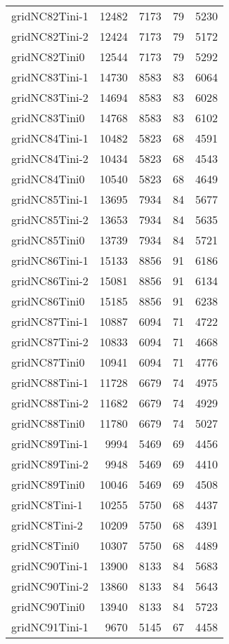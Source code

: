 \begin{longtable}{lrrrr}
gridNC82Tini-1 & 12482 & 7173 & 79 & 5230 \\
gridNC82Tini-2 & 12424 & 7173 & 79 & 5172 \\
gridNC82Tini0 & 12544 & 7173 & 79 & 5292 \\
gridNC83Tini-1 & 14730 & 8583 & 83 & 6064 \\
gridNC83Tini-2 & 14694 & 8583 & 83 & 6028 \\
gridNC83Tini0 & 14768 & 8583 & 83 & 6102 \\
gridNC84Tini-1 & 10482 & 5823 & 68 & 4591 \\
gridNC84Tini-2 & 10434 & 5823 & 68 & 4543 \\
gridNC84Tini0 & 10540 & 5823 & 68 & 4649 \\
gridNC85Tini-1 & 13695 & 7934 & 84 & 5677 \\
gridNC85Tini-2 & 13653 & 7934 & 84 & 5635 \\
gridNC85Tini0 & 13739 & 7934 & 84 & 5721 \\
gridNC86Tini-1 & 15133 & 8856 & 91 & 6186 \\
gridNC86Tini-2 & 15081 & 8856 & 91 & 6134 \\
gridNC86Tini0 & 15185 & 8856 & 91 & 6238 \\
gridNC87Tini-1 & 10887 & 6094 & 71 & 4722 \\
gridNC87Tini-2 & 10833 & 6094 & 71 & 4668 \\
gridNC87Tini0 & 10941 & 6094 & 71 & 4776 \\
gridNC88Tini-1 & 11728 & 6679 & 74 & 4975 \\
gridNC88Tini-2 & 11682 & 6679 & 74 & 4929 \\
gridNC88Tini0 & 11780 & 6679 & 74 & 5027 \\
gridNC89Tini-1 & 9994 & 5469 & 69 & 4456 \\
gridNC89Tini-2 & 9948 & 5469 & 69 & 4410 \\
gridNC89Tini0 & 10046 & 5469 & 69 & 4508 \\
gridNC8Tini-1 & 10255 & 5750 & 68 & 4437 \\
gridNC8Tini-2 & 10209 & 5750 & 68 & 4391 \\
gridNC8Tini0 & 10307 & 5750 & 68 & 4489 \\
gridNC90Tini-1 & 13900 & 8133 & 84 & 5683 \\
gridNC90Tini-2 & 13860 & 8133 & 84 & 5643 \\
gridNC90Tini0 & 13940 & 8133 & 84 & 5723 \\
gridNC91Tini-1 & 9670 & 5145 & 67 & 4458 \\

\end{longtable}
